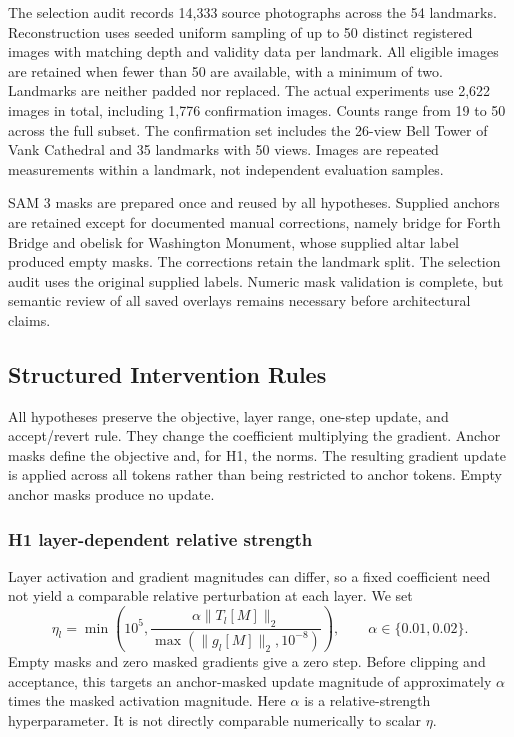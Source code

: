 The selection audit records 14,333 source photographs across the 54 landmarks. Reconstruction uses seeded uniform sampling of up to 50 distinct registered images with matching depth and validity data per landmark. All eligible images are retained when fewer than 50 are available, with a minimum of two. Landmarks are neither padded nor replaced. The actual experiments use 2,622 images in total, including 1,776 confirmation images. Counts range from 19 to 50 across the full subset. The confirmation set includes the 26-view Bell Tower of Vank Cathedral and 35 landmarks with 50 views. Images are repeated measurements within a landmark, not independent evaluation samples.

SAM 3 masks are prepared once and reused by all hypotheses. Supplied anchors are retained except for documented manual corrections, namely bridge for Forth Bridge and obelisk for Washington Monument, whose supplied altar label produced empty masks. The corrections retain the landmark split. The selection audit uses the original supplied labels. Numeric mask validation is complete, but semantic review of all saved overlays remains necessary before architectural claims.

\subsection{Structured Intervention Rules}
\label{sec:structured-rules}
All hypotheses preserve the objective, layer range, one-step update, and accept/revert rule. They change the coefficient multiplying the gradient. Anchor masks define the objective and, for H1, the norms. The resulting gradient update is applied across all tokens rather than being restricted to anchor tokens. Empty anchor masks produce no update.

\subsubsection{H1 layer-dependent relative strength}
Layer activation and gradient magnitudes can differ, so a fixed coefficient need not yield a comparable relative perturbation at each layer. We set
\begin{equation}
 \eta_l=\min\!\left(10^5,
 \frac{\alpha\|T_l[M]\|_2}{\max(\|g_l[M]\|_2,10^{-8})}\right),
 \qquad \alpha\in\{0.01,0.02\}.
 \label{eq:structured-h1}
\end{equation}
Empty masks and zero masked gradients give a zero step. Before clipping and acceptance, this targets an anchor-masked update magnitude of approximately $\alpha$ times the masked activation magnitude. Here $\alpha$ is a relative-strength hyperparameter. It is not directly comparable numerically to scalar $\eta$.

